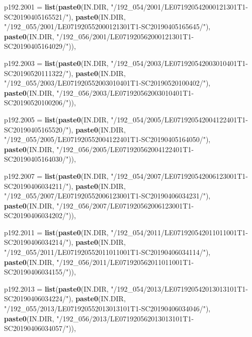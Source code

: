 \documentclass[a4paper, notitlepage, 12pt, krantz2]{krantz}
\newenvironment{Shaded}{\begin{snugshade}}{\end{snugshade}}
\newcommand{\DataTypeTok}[1]{\textcolor[rgb]{0.13,0.29,0.53}{#1}}
\newcommand{\KeywordTok}[1]{\textcolor[rgb]{0.13,0.29,0.53}{\textbf{#1}}}
\newcommand{\NormalTok}[1]{#1}
\newcommand{\StringTok}[1]{\textcolor[rgb]{0.31,0.60,0.02}{#1}}
\begin{document}
\begin{Shaded}
\begin{Highlighting}[]
  \DataTypeTok{p192.2001 =} \KeywordTok{list}\NormalTok{(}\KeywordTok{paste0}\NormalTok{(IN.DIR, }\StringTok{"/192_054/2001/LE071920542000121301T1-SC20190405165521/"}\NormalTok{),}
                   \KeywordTok{paste0}\NormalTok{(IN.DIR, }\StringTok{"/192_055/2001/LE071920552000121301T1-SC20190405165645/"}\NormalTok{),}
                   \KeywordTok{paste0}\NormalTok{(IN.DIR, }\StringTok{"/192_056/2001/LE071920562000121301T1-SC20190405164029/"}\NormalTok{)),}

  \DataTypeTok{p192.2003 =} \KeywordTok{list}\NormalTok{(}\KeywordTok{paste0}\NormalTok{(IN.DIR, }\StringTok{"/192_054/2003/LE071920542003010401T1-SC20190520111322/"}\NormalTok{),}
                   \KeywordTok{paste0}\NormalTok{(IN.DIR, }\StringTok{"/192_055/2003/LE071920552003010401T1-SC20190520100402/"}\NormalTok{),}
                   \KeywordTok{paste0}\NormalTok{(IN.DIR, }\StringTok{"/192_056/2003/LE071920562003010401T1-SC20190520100206/"}\NormalTok{)),}

  \DataTypeTok{p192.2005 =} \KeywordTok{list}\NormalTok{(}\KeywordTok{paste0}\NormalTok{(IN.DIR, }\StringTok{"/192_054/2005/LE071920542004122401T1-SC20190405165520/"}\NormalTok{),}
                   \KeywordTok{paste0}\NormalTok{(IN.DIR, }\StringTok{"/192_055/2005/LE071920552004122401T1-SC20190405164050/"}\NormalTok{),}
                   \KeywordTok{paste0}\NormalTok{(IN.DIR, }\StringTok{"/192_056/2005/LE071920562004122401T1-SC20190405164030/"}\NormalTok{)),}

  \DataTypeTok{p192.2007 =} \KeywordTok{list}\NormalTok{(}\KeywordTok{paste0}\NormalTok{(IN.DIR, }\StringTok{"/192_054/2007/LE071920542006123001T1-SC20190406034211/"}\NormalTok{),}
                   \KeywordTok{paste0}\NormalTok{(IN.DIR, }\StringTok{"/192_055/2007/LE071920552006123001T1-SC20190406034231/"}\NormalTok{),}
                   \KeywordTok{paste0}\NormalTok{(IN.DIR, }\StringTok{"/192_056/2007/LE071920562006123001T1-SC20190406034202/"}\NormalTok{)),}

  \DataTypeTok{p192.2011 =} \KeywordTok{list}\NormalTok{(}\KeywordTok{paste0}\NormalTok{(IN.DIR, }\StringTok{"/192_054/2011/LE071920542011011001T1-SC20190406034214/"}\NormalTok{),}
                   \KeywordTok{paste0}\NormalTok{(IN.DIR, }\StringTok{"/192_055/2011/LE071920552011011001T1-SC20190406034114/"}\NormalTok{),}
                   \KeywordTok{paste0}\NormalTok{(IN.DIR, }\StringTok{"/192_056/2011/LE071920562011011001T1-SC20190406034155/"}\NormalTok{)),}

  \DataTypeTok{p192.2013 =} \KeywordTok{list}\NormalTok{(}\KeywordTok{paste0}\NormalTok{(IN.DIR, }\StringTok{"/192_054/2013/LE071920542013013101T1-SC20190406034224/"}\NormalTok{),}
                   \KeywordTok{paste0}\NormalTok{(IN.DIR, }\StringTok{"/192_055/2013/LE071920552013013101T1-SC20190406034046/"}\NormalTok{),}
                   \KeywordTok{paste0}\NormalTok{(IN.DIR, }\StringTok{"/192_056/2013/LE071920562013013101T1-SC20190406034057/"}\NormalTok{)),}


\end{Highlighting}
\end{Shaded}
\end{document}
